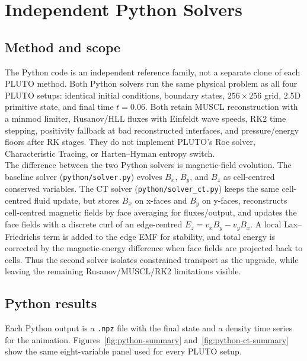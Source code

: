 \documentclass[11pt,a4paper]{article}
\begin{document}
\section{Independent Python Solvers}
\label{sec:python-solver}

\subsection{Method and scope}

The Python code is an independent reference family, not a separate clone of each PLUTO method. Both Python solvers run the same physical problem as all four PLUTO setups: identical initial conditions, boundary states, $256 \times 256$ grid, 2.5D primitive state, and final time $t=0.06$. Both retain MUSCL reconstruction with a minmod limiter, Rusanov/HLL fluxes with Einfeldt wave speeds, RK2 time stepping, positivity fallback at bad reconstructed interfaces, and pressure/energy floors after RK stages. They do not implement PLUTO's Roe solver, Characteristic Tracing, or Harten--Hyman entropy switch.
\\

The difference between the two Python solvers is magnetic-field evolution. The baseline solver (\texttt{python/solver.py}) evolves $B_x$, $B_y$, and $B_z$ as cell-centred conserved variables. The CT solver (\texttt{python/solver\_ct.py}) keeps the same cell-centred fluid update, but stores $B_x$ on x-faces and $B_y$ on y-faces, reconstructs cell-centred magnetic fields by face averaging for fluxes/output, and updates the face fields with a discrete curl of an edge-centred $E_z = v_xB_y - v_yB_x$. A local Lax--Friedrichs term is added to the edge EMF for stability, and total energy is corrected by the magnetic-energy difference when face fields are projected back to cells. Thus the second solver isolates constrained transport as the upgrade, while leaving the remaining Rusanov/MUSCL/RK2 limitations visible.

\subsection{Python results}

Each Python output is a \texttt{.npz} file with the final state and a density time series for the animation. Figures~\ref{fig:python-summary} and~\ref{fig:python-ct-summary} show the same eight-variable panel used for every PLUTO setup.
\end{document}
